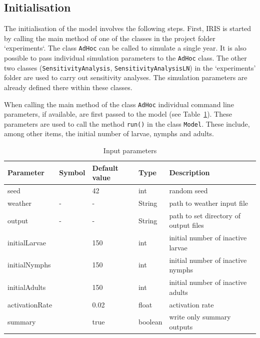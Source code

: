 \documentclass[a4paper, 11pt]{scrartcl}
\newcommand{\inlinecode}[1]{\texttt{\small #1}}
\begin{document}
\subsection{Initialisation}\label{initialisation}
The initialisation of the model involves the following steps. First, IRIS is started by calling the main method of one of the classes in the project folder `experiments`. The class \inlinecode{AdHoc} can be called to simulate a single year. It is also possible to pass individual simulation parameters to the \inlinecode{AdHoc} class. The other two classes (\inlinecode{SensitivityAnalysis}, \inlinecode{SensitivityAnalysisLN}) in the `experiments' folder are used to carry out sensitivity analyses. The simulation parameters are already defined there within these classes.

When calling the main method of the class \inlinecode{AdHoc} individual command line parameters, if available, are first passed to the model (see Table~\ref{tab:initialisation_parameters}). These parameters are used to call the method \inlinecode{run()} in the class \inlinecode{Model}. These include, among other items, the initial number of larvae, nymphs and adults.

\begin{table}[h!]
\caption{Input parameters}
\label{tab:initialisation_parameters}
\begin{tabularx}{\textwidth}{lllll}
\toprule
\textbf{Parameter} 	& \textbf{Symbol} & \textbf{Default value} & \textbf{Type} & \textbf{Description} \\
\midrule
seed    			&   & 42    & int     & random seed \\
weather     		& - & -     & String  & path to weather input file \\
output     			& - & -     & String  & path to set directory of output files \\
initialLarvae       &   & 150   & int     & initial number of inactive larvae \\
initialNymphs       &   & 150   & int     & initial number of inactive nymphs \\
initialAdults       &   & 150   & int     & initial number of inactive adults \\
activationRate      &   & 0.02  & float   & activation rate  \\
summary       		&   & true & boolean & write only summary outputs \\
\bottomrule
\end{tabularx}
\end{table}
\end{document}
